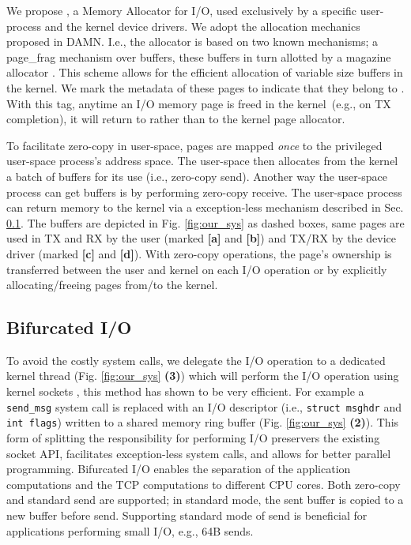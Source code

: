We propose \oursys, a Memory Allocator for I/O, used exclusively by a specific user-process and the kernel device drivers. 
We adopt the allocation mechanics proposed in DAMN\cite{markuze2018damn}. I.e., the allocator is based on two known mechanisms; a page\_frag mechanism \cite{pagefrag} over \size buffers, these buffers in turn allotted by a magazine allocator \cite{bonwick2001magazines}. This scheme allows for the efficient allocation of variable size buffers in the kernel. 
We mark the metadata of these \oursys pages to indicate that they belong to \oursys. With this tag, anytime an I/O  memory page is freed in the kernel~(e.g., on TX completion), it will return to \oursys rather than to the kernel page allocator. 

To facilitate zero-copy in user-space, \oursys pages are mapped \emph{once} to the privileged user-space process's address space. The user-space then allocates from the kernel a batch of buffers for its use (i.e., zero-copy send). Another way the user-space process can get \oursys buffers is by performing zero-copy receive. The user-space process can return memory to the kernel via a exception-less mechanism described in Sec. \ref{sec:bifurcated}.
The \oursys buffers are depicted in Fig. \ref{fig:our_sys} as dashed boxes, same pages are used in TX and RX by the user (marked \textbf{[a]} and \textbf{[b]}) and TX/RX by the device driver (marked \textbf{[c]} and \textbf{[d]}). With zero-copy operations, the page's ownership is transferred between the user and kernel on each I/O operation or by explicitly allocating/freeing pages from/to the kernel.
\subsection{Bifurcated I/O}\label{sec:bifurcated}
To avoid the costly system calls, we delegate the I/O operation to a dedicated kernel thread (Fig. \ref{fig:our_sys} \textbf{(3)}) which will perform the I/O operation using kernel sockets \cite{ktcp}, this method has shown to be very efficient. For example a \texttt{send\_msg} system call is replaced with an I/O descriptor (i.e., \texttt{struct msghdr} and \texttt{int flags}) written to a shared memory ring buffer (Fig. \ref{fig:our_sys} \textbf{(2)}). This form of splitting the responsibility for performing I/O preservers the existing socket API, facilitates exception-less system calls, and allows for better parallel programming. Bifurcated I/O enables the separation of the application computations and the TCP computations to different CPU cores. Both zero-copy and standard send are supported; in standard mode, the sent buffer is copied to a new \oursys buffer before send. Supporting standard mode of send is beneficial for applications performing small I/O, e.g., 64B sends.


